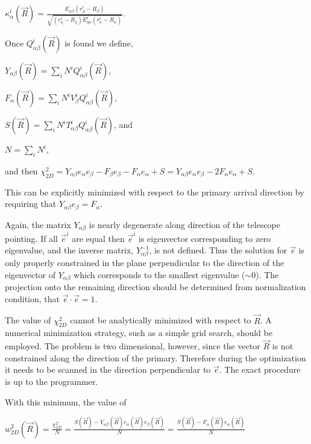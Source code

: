 \documentclass[letterpaper]{article}
\begin{document}
$\displaystyle \kappa_{\alpha}^{i}(\vec{R})
=\frac{E_{\alpha\beta}\left(r_{\beta}^{i}-R_{\beta}\right)}
{\sqrt{(r_{\eta}^{i}-R_{\eta})E_{\eta\kappa}^{i}(r_{\kappa}^{i}-R_{\kappa})}}$.

Once $Q_{\alpha\beta}^{i}(\vec{R})$ is found we define,

$\displaystyle Y_{\alpha\beta}(\vec{R})
=\sum\limits_{i}N^{i}Q_{\alpha\beta}^{i}(\vec{R})$,

$\displaystyle F_{\alpha}(\vec{R})
=\sum\limits_{i}N^{i}V_{\beta}^{i}Q_{\alpha\beta}^{i}(\vec{R})$,

$\displaystyle S(\vec{R})
=\sum\limits_{i}N^{i}T_{\alpha\beta}^{i}Q_{\alpha\beta}^{i}(\vec{R})$, and

$\displaystyle N=\sum\limits_{i}N^{i}$,

and then $\chi_{2D}^{2}=Y_{\alpha\beta}e_{\alpha}e_{\beta}
-F_{\beta}e_{\beta}-F_{\alpha}e_{\alpha}+S 
=Y_{\alpha\beta}e_{\alpha}e_{\beta}-2F_{\alpha}e_{\alpha}+S$.

This can be explicitly minimized with respect to the primary arrival
direction by requiring that $Y_{\alpha\beta}e_{\beta}=F_{\alpha}$.

Again, the matrix $Y_{\alpha\beta}$ is nearly degenerate along
direction of the telescope pointing. If all $\vec{e}^{i}$ are equal
then $\vec{e}^{i}$ is eigenvector corresponding to zero eigenvalue,
and the inverse matrix, $Y^{-1}_{\alpha\beta}$, is not defined. Thus
the solution for $\vec{e}$ is only properly constrained in the plane
perpendicular to the direction of the eigenvector of $Y_{\alpha\beta}$
which corresponds to the smallest eigenvalue ($\sim0$). The projection
onto the remaining direction should be determined from normalization
condition, that $\vec{e}\cdot\vec{e}=1$.

The value of $\chi_{2D}^{2}$ cannot be analytically minimized with
respect to $\vec{R}$. A numerical minimization strategy, such as a
simple grid search, should be employed. The problem is two
dimensional, however, since the vector $\vec{R}$ is not constrained
along the direction of the primary. Therefore during the optimization
it needs to be scanned in the direction perpendicular to
$\vec{e}$. The exact procedure is up to the programmer.

With this minimum, the value of

$\displaystyle w_{2D}^{2}(\vec{R})=\frac{\chi_{2D}^{2}}{N} =
\frac{S(\vec{R})
-Y_{\alpha\beta}(\vec{R})e_{\alpha}(\vec{R})e_{\beta}(\vec{R})}{N} =
\frac{S(\vec{R})-F_{\alpha}(\vec{R})e_{\alpha}(\vec{R})}{N}$
\end{document}

